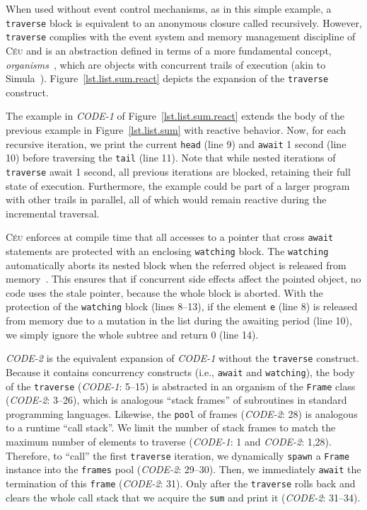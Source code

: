 \documentclass{sig-alternate}
\newcommand{\CEU}{\textsc{C\'{e}u}\xspace}
\newcommand{\code}[1] {{\small{\texttt{#1}}}}
\begin{document}
When used without event control mechanisms, as in this simple example, a 
\code{traverse} block is equivalent to an anonymous closure called recursively.
%
However, \code{traverse} complies with the event system and memory management 
discipline of \CEU and is an abstraction defined in terms of a more fundamental 
concept, \emph{organisms}~\cite{ceu.mod15}, which are objects with concurrent 
trails of execution (akin to Simula~\cite{simula}).
%
Figure~\ref{lst.list.sum.react} depicts the expansion of the \code{traverse} 
construct.

The example in \emph{CODE-1} of Figure~\ref{lst.list.sum.react} extends the 
body of the previous example in Figure~\ref{lst.list.sum} with reactive 
behavior.
%
Now, for each recursive iteration, we print the current \code{head} (line 9) 
and \code{await} 1 second (line 10) before traversing the \code{tail} (line 
11).
%
Note that while nested iterations of \code{traverse} await 1 second, all 
previous iterations are blocked, retaining their full state of execution.
Furthermore, the example could be part of a larger program with other trails in 
parallel, all of which would remain reactive during the incremental traversal.

\CEU enforces at compile time that all accesses to a pointer that cross 
\code{await} statements are protected with an enclosing \code{watching} block.
%
The \code{watching} automatically aborts its nested block when the referred 
object is released from memory~\cite{ceu.mod15}.
%
This ensures that if concurrent side effects affect the pointed object, no code 
uses the stale pointer, because the whole block is aborted.
%
With the protection of the \code{watching} block (lines 8--13), if the element 
\code{e} (line 8) is released from memory due to a mutation in the list during 
the awaiting period (line 10), we simply ignore the whole subtree and return 0 
(line 14).

\emph{CODE-2} is the equivalent expansion of \emph{CODE-1} without the 
\code{traverse} construct.
%
Because it contains concurrency constructs (i.e., \code{await} and 
\code{watching}), the body of the \code{traverse} (\emph{CODE-1}: 5--15) is 
abstracted in an organism of the \code{Frame} class (\emph{CODE-2}: 3--26), 
which is analogous ``stack frames'' of subroutines in standard programming 
languages.
Likewise, the \code{pool} of frames (\emph{CODE-2}: 28) is analogous to a 
runtime ``call stack''.
We limit the number of stack frames to match the maximum number of elements to 
traverse (\emph{CODE-1}: 1 and \emph{CODE-2}: 1,28).
Therefore, to ``call'' the first \code{traverse} iteration, we dynamically 
\code{spawn} a \code{Frame} instance into the \code{frames} pool 
(\emph{CODE-2}: 29--30).
Then, we immediately \code{await} the termination of this \code{frame} 
(\emph{CODE-2}: 31).
Only after the \code{traverse} rolls back and clears the whole call stack
that we acquire the \code{sum} and print it (\emph{CODE-2}: 31--34).
\end{document}
